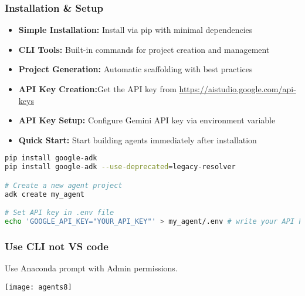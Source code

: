 \begin{frame}[fragile]\frametitle{Installation \& Setup}
      \begin{itemize}
	\item \textbf{Simple Installation:} Install via pip with minimal dependencies
	\item \textbf{CLI Tools:} Built-in commands for project creation and management
	\item \textbf{Project Generation:} Automatic scaffolding with best practices	
	\item \textbf{API Key Creation:}Get the API key from \url{https://aistudio.google.com/api-keys}
	\item \textbf{API Key Setup:} Configure Gemini API key via environment variable
	
	\item \textbf{Quick Start:} Start building agents immediately after installation
	  \end{itemize}
      
      \begin{lstlisting}[language=bash]
pip install google-adk
pip install google-adk --use-deprecated=legacy-resolver

# Create a new agent project
adk create my_agent

# Set API key in .env file
echo 'GOOGLE_API_KEY="YOUR_API_KEY"' > my_agent/.env # write your API key into an .env 
      \end{lstlisting}
\end{frame}

\begin{frame}[fragile]\frametitle{Use CLI not VS code}

Use Anaconda prompt with Admin permissions.

		\begin{center}
		\texttt{[image: agents8]}
		\end{center}	
\end{frame}
		
